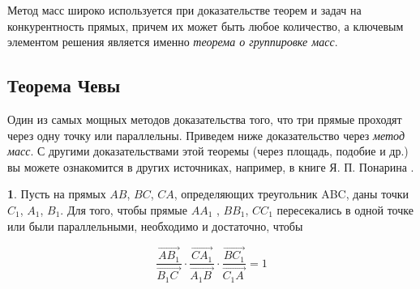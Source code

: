 \documentclass[14pt]{extarticle}
\let\Overrightarrow\overrightarrow
\theoremstyle{definition}
\theoremstyle{theorem}
\newenvironment{namedtheorem}[2]
{
\newcommand{\foo}{#1}
\newtheorem*{\foo{}}{\normalfont\fontsize{15}{15}{Теорема #2}}
\begin{\foo{}}
}
{\end{\foo{}}}
\begin{document}
Метод масс широко используется при доказательстве теорем и задач на
конкурентность прямых, причем их может быть любое количество, а ключевым 
элементом решения является именно \textit{теорема о группировке масс}. 


\subsection{Теорема Чевы} 

\indent Один из самых мощных методов доказательства того, что три прямые 
проходят через одну точку или параллельны. 
Приведем ниже доказательство через \textit{метод масс}.
С другими доказательствами этой теоремы (через площадь, подобие и др.) 
вы можете ознакомится в других источниках, например, в книге Я. П. Понарина
.\\


\begin{namedtheorem}{ceva}{Чевы}
	Пусть на прямых $AB$, $BC$, $CA$, определяющих
    треугольник ABC, даны точки $C_1$, $A_1$, $B_1$. Для того, чтобы прямые
    $AA_1$ , $BB_1$, $CC_1$ пересекались в одной точке или были параллельными,
    необходимо и достаточно, чтобы
	
	\begin{ceqn}
	\[
    \dfrac{\Overrightarrow{AB_1}}{\Overrightarrow{B_1C_{\, \,}}} \cdot 
	\dfrac{\Overrightarrow{CA_1}}
	{\Overrightarrow{A_1B_{\:}}} \cdot \dfrac{\Overrightarrow{BC_1}}
	{\Overrightarrow{C_1A_{\,}}} = 1
	\]
    \end{ceqn}

\end{namedtheorem}


\begin{figure}
	\hspace{-0.3cm}
	\vspace{-0.6cm}
	\vspace{-1.7cm}
\end{figure}
\end{document}
